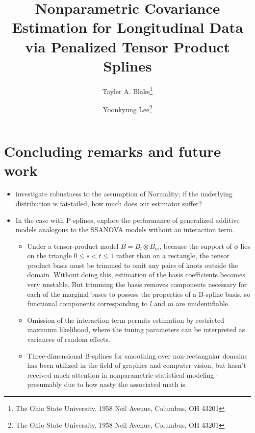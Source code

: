 \documentclass[12pt]{article}
\theoremstyle{definition}
\def\bL{\mathbf{L}}
\begin{document}
\def\bL{\mathbf{L}}



\title{ Nonparametric Covariance Estimation for Longitudinal Data via Penalized Tensor Product Splines}

\author{Tayler A. Blake\thanks{The Ohio State University, 1958 Neil Avenue, Columbus, OH 43201} \and  Yoonkyung Lee\thanks{The Ohio State University, 1958 Neil Avenue, Columbus, OH 43201}}


\maketitle

\section{Concluding remarks and future work}

\begin{itemize}
\item investigate robustness to the assumption of Normality; if the underlying distribution is fat-tailed, how much does our estimator suffer?
\item In the case with P-splines, explore the performance of generalized additive models analogous to the SSANOVA models without an interaction term.
	\begin{itemize}
	\item Under a tensor-product model $B = B_l \otimes B_m$, because the support of $\phi$ lies on the triangle $0 \le s < t \le 1$ rather than on a rectangle, the tensor product basis must be trimmed to omit any pairs of knots outside the domain. Without doing this, estimation of the basis coefficients becomes very unstable. But trimming the basis removes components necessary for each of the marginal bases to possess the properties of a B-spline basis, so functional components corresponding to $l$ and $m$ are unidentifiable. 
	\item Omission of the interaction term permits estimation by restricted maximum likelihood, where the tuning parameters can be interpreted as variances of random effects.
	\item Three-dimensional B-splines for smoothing over non-rectangular domains has been utilized in the field of graphics and computer vision, but hasn't received much attention in nonparametric statistical modeling - presumably due to how nasty the associated math is. 
	\end{itemize}
\end{itemize}
\end{document}
